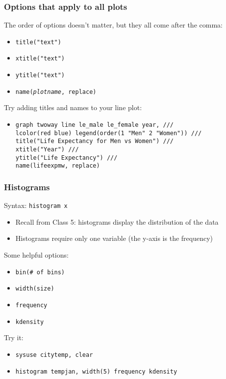 \documentclass[11pt]{beamer}
\begin{document}
\begin{frame}
\frametitle{Options that apply to all plots}
The order of options doesn't matter, but they all come after the comma:
\begin{itemize}
	\item \texttt{title("text")}
	\item \texttt{xtitle("text")}
	\item \texttt{ytitle("text")}
	\item \texttt{name(\textit{plotname}, replace)}
\end{itemize} \pause \bigskip
Try adding titles and names to your line plot:
\begin{itemize}
	\item[] \texttt{graph twoway line le\_male le\_female year\alert{,} /// \\
					lcolor(red blue) legend(order(1 "Men" 2 "Women")) /// \\
					\alert{title}("Life Expectancy for Men	vs Women") /// \\
					\alert{xtitle}("Year") /// \\
					\alert{ytitle}("Life Expectancy") /// \\
					\alert{name}(lifeexpmw, replace)}
\end{itemize}
\end{frame} 

\begin{frame}
\frametitle{Histograms}
Syntax: \texttt{histogram x}
\begin{itemize}
        \item Recall from Class 5: histograms display the distribution of the data
        \item Histograms require only one variable (the y-axis is the frequency)
\end{itemize} \bigskip \pause
Some helpful options:
\begin{itemize}
	\item \texttt{bin(\# of bins)} 
	\item \texttt{width(size)}
	\item \texttt{frequency}
	\item \texttt{kdensity}
\end{itemize} \bigskip \pause
Try it:
\begin{itemize}
	\item[] \texttt{sysuse citytemp, clear}
	\item[] \texttt{histogram tempjan, width(5) frequency kdensity}
\end{itemize}
\end{frame}
\end{document}
